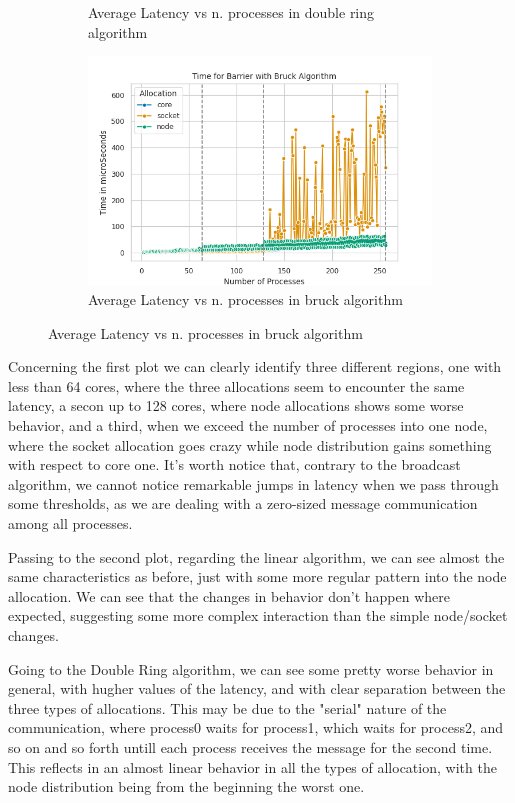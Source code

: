 \documentclass{article}
\begin{document}
\begin{figure}[h]
\begin{subfigure}{0.45\textwidth}
			\caption{Average Latency vs n. processes in double ring algorithm}
			\label{fig:barrierring}
		\end{subfigure}
		\begin{subfigure}{0.45\textwidth}
			\centering
			\includegraphics[width=0.7\linewidth]{../exercise1/plots/barrier_bruck}
			\caption{Average Latency vs n. processes in bruck algorithm}
			\label{fig:barrierbruck}
		\end{subfigure}
	\end{figure}
	
	Concerning the first plot we can clearly identify three different regions, one with less than 64 cores, where the three allocations seem to encounter the same latency, a secon up to 128 cores, where node allocations shows some worse behavior, and a third, when we exceed the number of processes into one node, where the socket allocation goes crazy while node distribution gains something with respect to core one. It's worth notice that, contrary to the broadcast algorithm, we cannot notice remarkable jumps in latency when we pass through some thresholds, as we are dealing with a zero-sized message communication among all processes.
	
	Passing to the second plot, regarding the linear algorithm, we can see almost the same characteristics as before, just with some more regular pattern into the node allocation. We can see that the changes in behavior don't happen where expected, suggesting some more complex interaction than the simple node/socket changes.
	
	Going to the Double Ring algorithm, we can see some pretty worse behavior in general, with hugher values of the latency, and with clear separation between the three types of allocations. This may be due to the "serial" nature of the communication, where process0 waits for process1, which waits for process2, and so on and so forth untill each process receives the message for the second time. This reflects in an almost linear behavior in all the types of allocation, with the node distribution being from the beginning the worst one.
	
\end{document}
